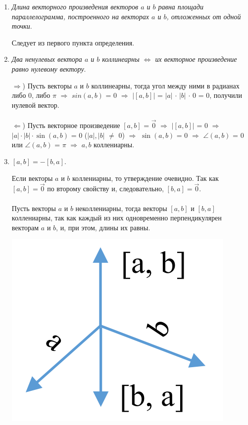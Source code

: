 \begin{enumerate}
	\item \textit{Длина векторного произведения векторов $a$ и $b$ равна площади параллелограмма, построенного на векторах $a$ и $b$, отложенных от одной точки}.\begin{Proof}
		Следует из первого пункта определения.
	\end{Proof}
	\item \textit{Два ненулевых вектора $a$ и $b$ коллинеарны $\Longleftrightarrow$ их векторное произведение равно нулевому вектору}.
	\begin{Proof}
		$\Rightarrow$) Пусть векторы $a$ и $b$ коллинеарны, тогда угол между ними в радианах либо 0, либо $\pi$ $\Rightarrow$ $sin (a, b)$ = 0 $\Rightarrow$ $|[a, b]|$ = $|a|$ $\cdot$ $|b|$ $\cdot$ 0 = 0, получили нулевой вектор. \\\\
		$\Leftarrow$) Пусть векторное произведение $[a, b]$ = $\overrightarrow{0}$ $\Rightarrow$ $|[a, b]|$ = 0 $\Rightarrow$ $|a| \cdot|b|\cdot \sin(a, b)$ = 0 ($|a|, |b|$ $\not=$ 0) $\Rightarrow$ $\sin (a, b)$ = 0 $\Rightarrow$ $\angle$$(a, b)$ = 0 или $\angle$$(a, b)$ = $\pi$ $\Rightarrow$ $a, b$ коллениарны.
	\end{Proof}
	\item $[a, b] = - [b, a]$.
	\begin{Proof}
		Если векторы $a$ и $b$ коллениарны, то утверждение очевидно. Так как $[a, b]=\overrightarrow{0}$ по второму свойству и, следовательно, $[b, a]=\overrightarrow{0}$.\\\\
		Пусть векторы $a$ и $b$ неколлениарны, тогда векторы $[a, b]$ и $[b, a]$ коллениарны, так как каждый из них одновременно перпендикулярен векторам $a$ и $b$, и, при этом, длины их равны. \begin{center}
			\includegraphics[scale=0.3]{images/vecs_3_5.png}

\end{center}
\end{Proof}
\end{enumerate}
